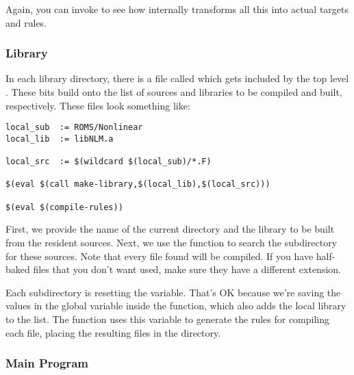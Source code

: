 Again, you can invoke  to see how 
internally transforms all this into actual targets and rules.

\subsubsection{Library }

In each library directory, there is a file called 
which gets included by the top level . These
 bits build onto the list of sources and libraries
to be compiled and built, respectively.
These  files look something like:
\begin{verbatim}
local_sub  := ROMS/Nonlinear
local_lib  := libNLM.a

local_src  := $(wildcard $(local_sub)/*.F)

$(eval $(call make-library,$(local_lib),$(local_src)))

$(eval $(compile-rules))
\end{verbatim}
First, we provide the name of the current directory and the library
to be built from the resident sources.  Next, we use the 
function to search the subdirectory for these sources. Note that
every  file found will be compiled. If you have half-baked
files that you don't want used, make sure they have a different
extension.

Each subdirectory is resetting the  variable. That's
OK because we're saving the values in the global  variable
inside the  function, which also adds the local library
to the  list. The  function uses this
 variable to generate the rules for compiling each file,
placing the resulting files in the  directory.


\subsubsection{Main Program}

